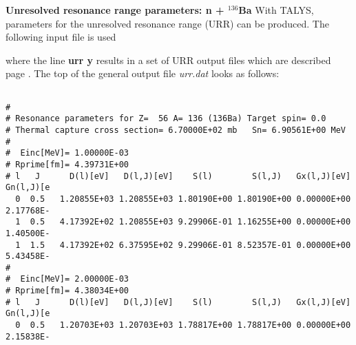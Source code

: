 \begin{samplecase}
{\bf Unresolved resonance range parameters: n + ${}^{136}$Ba}\newline
With TALYS, parameters for the unresolved resonance range (URR) can be produced.
The following input file is used


where the line {\bf urr y} results in a set of URR output files which are
described page \pageref{key:urr}. The top of the general output file {\em urr.dat}
looks as follows:
{\small \begin{verbatim}

#
# Resonance parameters for Z=  56 A= 136 (136Ba) Target spin= 0.0
# Thermal capture cross section= 6.70000E+02 mb   Sn= 6.90561E+00 MeV
#
#  Einc[MeV]= 1.00000E-03
# Rprime[fm]= 4.39731E+00
# l   J      D(l)[eV]   D(l,J)[eV]    S(l)        S(l,J)   Gx(l,J)[eV] Gn(l,J)[e
  0  0.5   1.20855E+03 1.20855E+03 1.80190E+00 1.80190E+00 0.00000E+00 2.17768E-
  1  0.5   4.17392E+02 1.20855E+03 9.29906E-01 1.16255E+00 0.00000E+00 1.40500E-
  1  1.5   4.17392E+02 6.37595E+02 9.29906E-01 8.52357E-01 0.00000E+00 5.43458E-
#
#  Einc[MeV]= 2.00000E-03
# Rprime[fm]= 4.38034E+00
# l   J      D(l)[eV]   D(l,J)[eV]    S(l)        S(l,J)   Gx(l,J)[eV] Gn(l,J)[e
  0  0.5   1.20703E+03 1.20703E+03 1.78817E+00 1.78817E+00 0.00000E+00 2.15838E-
\end{verbatim} } \renewcommand{\baselinestretch}{1.07}\small\normalsize
\noindent
\end{samplecase}
